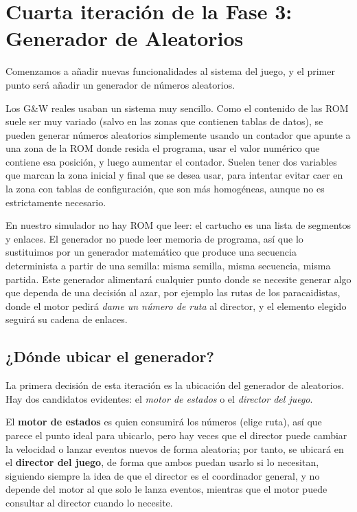 \section{Cuarta iteración de la Fase 3: Generador de Aleatorios}
\label{sec:GeneradorAleatorios}

Comenzamos a añadir nuevas funcionalidades al sistema del juego, y el primer
punto será añadir un generador de números aleatorios.

Los G\&W reales usaban un sistema muy sencillo. Como el contenido de las ROM
suele ser muy variado (salvo en las zonas que contienen tablas de datos), se
pueden generar números aleatorios simplemente usando un contador que apunte a
una zona de la ROM donde resida el programa, usar el valor numérico que contiene esa posición, y luego aumentar el contador. Suelen tener dos variables que marcan la zona inicial y final que se desea usar, para intentar evitar caer en la zona con tablas de
configuración, que son más homogéneas, aunque no es estrictamente necesario.

En nuestro simulador no hay ROM que leer: el cartucho es una lista de
segmentos y enlaces. El generador no puede leer memoria de programa, así
que lo sustituimos por un generador matemático que produce una secuencia
determinista a partir de una semilla: misma semilla, misma secuencia, misma
partida. Este generador alimentará cualquier punto donde se necesite generar algo que
dependa de una decisión al azar, por ejemplo las rutas de los paracaidistas, 
donde el motor pedirá \emph{dame un número de ruta} al director, y el elemento
elegido seguirá su cadena de enlaces.

\subsection{¿Dónde ubicar el generador?}

La primera decisión de esta iteración es la ubicación del generador de aleatorios. 
Hay dos candidatos evidentes: el \emph{motor de estados} o el
\emph{director del juego}.

El \textbf{motor de estados} es quien consumirá los números (elige ruta), así que
parece el punto ideal para ubicarlo, pero hay veces que el director puede cambiar la velocidad o lanzar eventos nuevos de forma aleatoria; por tanto, se ubicará en
el \textbf{director del juego}, de forma que ambos puedan usarlo si lo necesitan, siguiendo
siempre la idea de que el director es el coordinador general, y no depende del motor al que solo le lanza eventos, mientras que el motor puede consultar al director cuando lo necesite.

